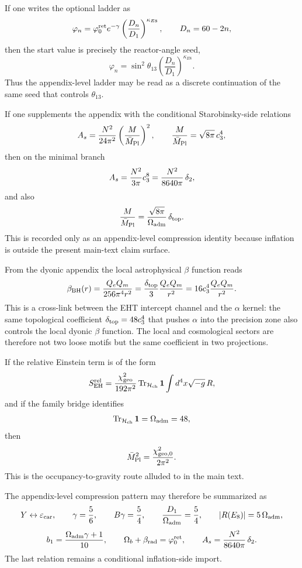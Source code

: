 \begin{remark}
If one writes the optional ladder as
\[
\varphi_n=\varphi_0^{\mathrm{ret}} e^{-\gamma}\left(\frac{D_n}{D_1}\right)^{\kappa_{E8}},
\qquad
D_n=60-2n,
\]
then the start value is precisely the reactor-angle seed,
\[
\varphi_n=\sin^2\theta_{13}\left(\frac{D_n}{D_1}\right)^{\kappa_{E8}}.
\]
Thus the appendix-level ladder may be read as a discrete continuation of the same seed that controls $\theta_{13}$.
\end{remark}

\begin{remark}
If one supplements the appendix with the conditional Starobinsky-side relations
\[
A_s=\frac{N^2}{24\pi^2}\left(\frac{M}{\bar M_{\mathrm{Pl}}}\right)^2,
\qquad
\frac{M}{\bar M_{\mathrm{Pl}}}=\sqrt{8\pi}\,c_3^4,
\]
then on the minimal branch
\[
A_s=\frac{N^2}{3\pi}c_3^8=\frac{N^2}{8640\pi}\,\delta_2,
\]
and also
\[
\frac{M}{\bar M_{\mathrm{Pl}}}=\frac{\sqrt{8\pi}}{\Omega_{\mathrm{adm}}}\,\delta_{\mathrm{top}}.
\]
This is recorded only as an appendix-level compression identity because inflation is outside the present main-text claim surface.
\end{remark}

\begin{remark}
From the dyonic appendix the local astrophysical $\beta$ function reads
\[
\beta_{\mathrm{BH}}(r)=\frac{Q_eQ_m}{256\pi^4 r^2}=\frac{\delta_{\mathrm{top}}}{3}\frac{Q_eQ_m}{r^2}=16c_3^4\frac{Q_eQ_m}{r^2}.
\]
This is a cross-link between the EHT intercept channel and the $\alpha$ kernel: the same topological coefficient $\delta_{\mathrm{top}}=48c_3^4$ that pushes $\alpha$ into the precision zone also controls the local dyonic $\beta$ function. The local and cosmological sectors are therefore not two loose motifs but the same coefficient in two projections.
\end{remark}

\begin{remark}
If the relative Einstein term is of the form
\[
S_{\mathrm{EH}}^{\mathrm{rel}}
=
\frac{\chi_{\mathrm{geo}}^2}{192\pi^2}\operatorname{Tr}_{\mathcal H_{\mathrm{ch}}}\mathbf 1
\int d^4x\sqrt{-g}\,R,
\]
and if the family bridge identifies
\[
\operatorname{Tr}_{\mathcal H_{\mathrm{ch}}}\mathbf 1=\Omega_{\mathrm{adm}}=48,
\]
then
\[
\bar M_{\mathrm{Pl}}^2=\frac{\chi_{\mathrm{geo},0}^2}{2\pi^2}.
\]
This is the occupancy-to-gravity route alluded to in the main text.
\end{remark}

\begin{remark}
The appendix-level compression pattern may therefore be summarized as
\[
Y \leftrightarrow \varepsilon_{\mathrm{car}},
\qquad
\gamma=\frac56,
\qquad
B\gamma=\frac54,
\qquad
\frac{D_1}{\Omega_{\mathrm{adm}}}=\frac54,
\qquad
|R(E_8)|=5\,\Omega_{\mathrm{adm}},
\]
\[
b_1=\frac{\Omega_{\mathrm{adm}}\gamma+1}{10},
\qquad
\Omega_b+\beta_{\mathrm{rad}}=\varphi_0^{\mathrm{ret}},
\qquad
A_s=\frac{N^2}{8640\pi}\,\delta_2.
\]
The last relation remains a conditional inflation-side import.
\end{remark}


